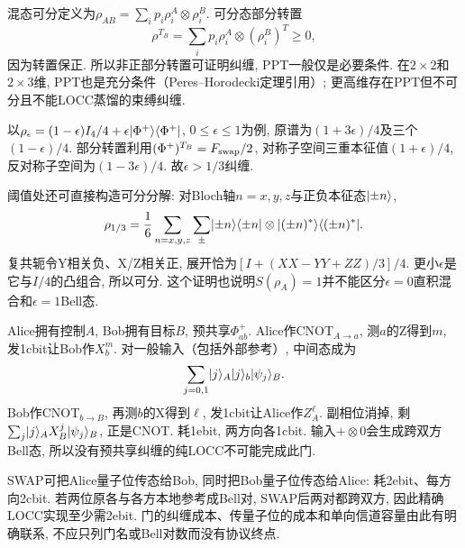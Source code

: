 混态可分定义为$\rho_{AB}=\sum_ip_i\rho_i^A\otimes\rho_i^B$. 可分态部分转置
\[\rho^{T_B}=\sum_ip_i\rho_i^A\otimes(\rho_i^B)^T\ge0,\]
因为转置保正. 所以非正部分转置可证明纠缠, PPT一般仅是必要条件. 在$2\times2$和$2\times3$维, PPT也是充分条件（Peres--Horodecki定理引用）; 更高维存在PPT但不可分且不能LOCC蒸馏的束缚纠缠.

以$\rho_\epsilon=(1-\epsilon)I_4/4+\epsilon\lvert \Phi^+\rangle\langle \Phi^+\rvert$, $0\le\epsilon\le1$为例, 原谱为$(1+3\epsilon)/4$及三个$(1-\epsilon)/4$. 部分转置利用$(\Phi^+)^{T_B}=F_{\rm swap}/2$, 对称子空间三重本征值$(1+\epsilon)/4$, 反对称子空间为$(1-3\epsilon)/4$. 故$\epsilon>1/3$纠缠.

阈值处还可直接构造可分分解: 对Bloch轴$n=x,y,z$与正负本征态$\lvert \pm n\rangle$,
\[\rho_{1/3}=\frac16\sum_{n=x,y,z}\sum_{\pm}
 \lvert \pm n\rangle\langle \pm n\rvert\otimes
 \lvert (\pm n)^*\rangle\langle (\pm n)^*\rvert.\]
复共轭令Y相关负、X/Z相关正, 展开恰为$[I+(XX-YY+ZZ)/3]/4$. 更小$\epsilon$是它与$I/4$的凸组合, 所以可分. 这个证明也说明$S(\rho_A)=1$并不能区分$\epsilon=0$直积混合和$\epsilon=1$Bell态.

Alice拥有控制$A$, Bob拥有目标$B$, 预共享$\Phi^+_{ab}$. Alice作CNOT$_{A\to a}$, 测$a$的Z得到$m$, 发1cbit让Bob作$X_b^m$. 对一般输入（包括外部参考）, 中间态成为
\[\sum_{j=0,1}\lvert j\rangle_A\lvert j\rangle_b\lvert \psi_j\rangle_B.\]
Bob作CNOT$_{b\to B}$, 再测$b$的X得到$\ell$, 发1cbit让Alice作$Z_A^\ell$. 副相位消掉, 剩$\sum_j\lvert j\rangle_A X_B^j\lvert \psi_j\rangle_B$, 正是CNOT. 耗1ebit, 两方向各1cbit. 输入$+\otimes0$会生成跨双方Bell态, 所以没有预共享纠缠的纯LOCC不可能完成此门.

SWAP可把Alice量子位传态给Bob, 同时把Bob量子位传态给Alice: 耗2ebit、每方向2cbit. 若两位原各与各方本地参考成Bell对, SWAP后两对都跨双方, 因此精确LOCC实现至少需2ebit. 门的纠缠成本、传量子位的成本和单向信道容量由此有明确联系, 不应只列门名或Bell对数而没有协议终点.

